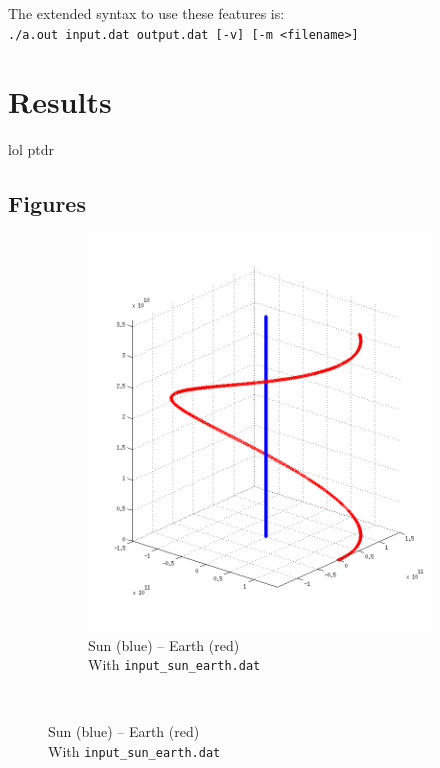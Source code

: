 \documentclass{article}
\begin{document}
The extended syntax to use these features is:\\
\texttt{./a.out input.dat output.dat [-v] [-m <filename>]}


\section*{Results}
lol ptdr
\subsection*{Figures}
\begin{figure}[H]
        \centering
        \begin{subfigure}[b]{0.3\textwidth}
                \centering
                \includegraphics[width=\textwidth]{img/sun_upz_earth_roty}
                \caption{Sun (blue) -- Earth (red)\\With \texttt{input\_sun\_earth.dat}}
                \label{fig:earthsun}
        \end{subfigure}%
        ~ %

\end{figure}
\end{document}
